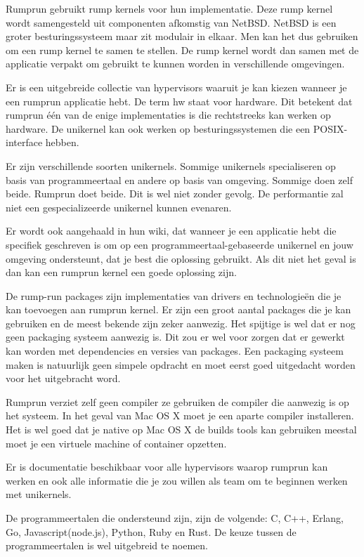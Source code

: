 \documentclass[pdftex,a4paper,12pt,twoside]{report}
\begin{document}
Rumprun gebruikt rump kernels voor hun implementatie. Deze rump kernel wordt samengesteld uit componenten afkomstig van NetBSD. NetBSD is een groter besturingssysteem maar zit modulair in elkaar. Men kan het dus gebruiken om een rump kernel te samen te stellen. De rump kernel wordt dan samen met de applicatie verpakt om gebruikt te kunnen worden in verschillende omgevingen.

Er is een uitgebreide collectie van hypervisors waaruit je kan kiezen wanneer je een rumprun applicatie hebt. De term hw staat voor hardware. Dit betekent dat rumprun één van de enige implementaties is die rechtstreeks kan werken op hardware. De unikernel kan ook werken op besturingssystemen die een POSIX-interface hebben.

Er zijn verschillende soorten unikernels. Sommige unikernels specialiseren op basis van programmeertaal en andere op basis van omgeving. Sommige doen zelf beide. Rumprun doet beide. Dit is wel niet zonder gevolg. De performantie zal niet een gespecializeerde unikernel kunnen evenaren.

Er wordt ook aangehaald in hun wiki, dat wanneer je een applicatie hebt die specifiek geschreven is om op een programmeertaal-gebaseerde unikernel en jouw omgeving ondersteunt, dat je best die oplossing gebruikt. Als dit niet het geval is dan kan een rumprun kernel een goede oplossing zijn.

De rump-run packages zijn implementaties van drivers en technologieën  die je kan toevoegen aan rumprun kernel. Er zijn een groot aantal packages die je kan gebruiken en de meest bekende zijn zeker aanwezig. Het spijtige is wel dat er nog geen packaging systeem aanwezig is. Dit zou er wel voor zorgen dat er gewerkt kan worden met dependencies en versies van packages. Een packaging systeem maken is natuurlijk geen simpele opdracht en moet eerst goed uitgedacht worden voor het uitgebracht word.

Rumprun verziet zelf geen compiler ze gebruiken de compiler die aanwezig is op het systeem. In het geval van Mac OS X moet je een aparte compiler installeren. Het is wel goed dat je native op Mac OS X de builds tools kan gebruiken meestal moet je een virtuele machine of container opzetten.

Er is documentatie beschikbaar voor alle hypervisors waarop rumprun kan werken en ook alle informatie die je zou willen als team om te beginnen werken met unikernels.

De programmeertalen die ondersteund zijn, zijn de volgende: C, C++, Erlang, Go, Javascript(node.js), Python, Ruby en Rust. De keuze tussen de programmeertalen is wel uitgebreid te noemen.
\end{document}
